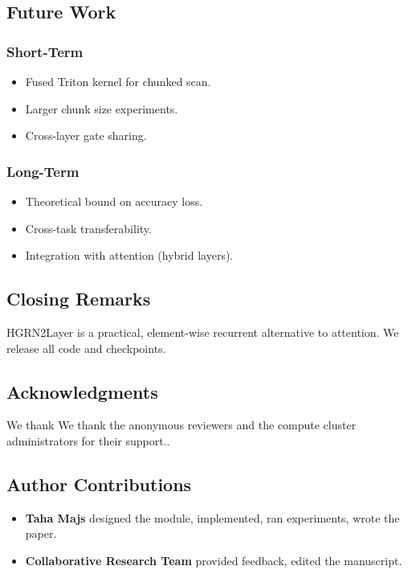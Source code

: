 \subsection{Future Work}

\subsubsection{Short-Term}
\begin{itemize}
\item Fused Triton kernel for chunked scan.
\item Larger chunk size experiments.
\item Cross-layer gate sharing.

\end{itemize}
\subsubsection{Long-Term}
\begin{itemize}
\item Theoretical bound on accuracy loss.
\item Cross-task transferability.
\item Integration with attention (hybrid layers).

\end{itemize}
\subsection{Closing Remarks}

HGRN2Layer is a practical, element-wise recurrent alternative to attention. 
We release all code and checkpoints.

\subsection{Acknowledgments}

We thank We thank the anonymous reviewers and the compute cluster administrators for their support..

\subsection{Author Contributions}

\begin{itemize}
\item \textbf{Taha Majs} designed the module, implemented, ran experiments, wrote
  the paper.
\item \textbf{Collaborative Research Team} provided feedback, edited the manuscript.

\end{itemize}
